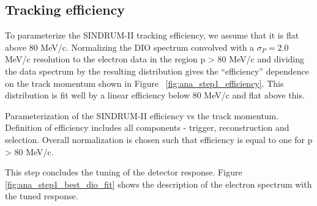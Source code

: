 \subsection{Tracking efficiency}

To parameterize the SINDRUM-II tracking efficiency, we assume that it is flat
above 80 MeV/c. Normalizing the DIO spectrum convolved with a $\sigma_P = 2.0$ MeV/c
resolution to the electron data in the region p > 80 MeV/c and dividing the data spectrum
by the resulting distribution gives the ``efficiency'' dependence on the track momentum
shown in Figure ~\ref{fig:ana_step1_efficiency}. This distribution is fit well by a 
linear efficiency below 80 MeV/c and flat above this.

%
 {
  \label{fig:ana_step1_efficiency}
  Parameterization of the SINDRUM-II efficiency vs the track momentum.
  Definition of efficiency includes all components - trigger, reconstruction and selection.
  Overall normalization is chosen such that efficiency is equal to one for p > 80 MeV/c.
}
\vspace{0.2in}

This step concludes the tuning of the detector response. Figure \ref{fig:ana_step1_best_dio_fit}
shows the description of the electron spectrum with the tuned response.


